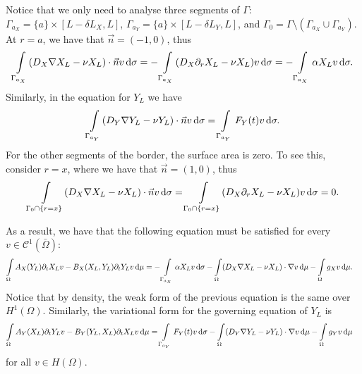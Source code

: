 \documentclass[11pt]{article}
\numberwithin{equation}{section}
\begin{document}
Notice that we only need to analyse three segments of $\Gamma$: $\Gamma_{a_X} = \{a\}\times [L-\delta L_X,L]$, $\Gamma_{a_Y} = \{a\} \times [L - \delta L_Y, L]$, and $ \Gamma_0 = \Gamma \setminus (\Gamma_{a_X} \cup \Gamma_{a_Y})$. At $r = a$, we have that $ \vec{n} = (-1,0)$, thus
\begin{align}
    \int\limits_{\Gamma_{a_X}}
    (D_X \nabla X_L - \nu X_L) \cdot \vec{n} v    \dif \sigma
    =
    -
    \int\limits_{\Gamma_{a_X}}
    (D_X \partial_r X_L - \nu X_L) v    \dif \sigma
    =
    -\int\limits_{\Gamma_{a_X}}
    \alpha X_L v    \dif \sigma.
\end{align}
Similarly, in the equation for \(Y_L\) we have
\begin{align}
    \int\limits_{\Gamma_{a_Y}}
    (D_Y \nabla Y_L - \nu Y_L) \cdot \vec{n} v    \dif \sigma
    =
    \int\limits_{\Gamma_{a_Y}}
    F_Y(t) v    \dif \sigma.
\end{align}
For the other segments of the border, the surface area is zero. To see this, consider $r = x$, where we have that $ \vec{n} = (1,0)$, thus
\begin{align}
    \int\limits_{\Gamma_0 \cap \{r=x\}}
    (D_X \nabla X_L - \nu X_L) \cdot \vec{n} v    \dif \sigma
    =
    \int\limits_{\Gamma_0 \cap \{r=x\}}
    (D_X \partial_r X_L - \nu X_L) v    \dif \sigma
    =
    0.
\end{align}

As a result, we have that the following equation must be satisfied for every $v \in \mathcal{C}^1 (\bar\Omega)$:
\begin{align}
    \int\limits_\Omega
    A_X(Y_L) \partial_t X_L v - B_X(X_L,Y_L) \partial_t Y_L v \dif \mu
    &=
    -\int\limits_{\Gamma_{a_X}}    \alpha X_L v    \dif \sigma
    -\int\limits_\Omega        (D_X \nabla X_L - \nu X_L) \cdot \nabla v  \dif \mu
    -\int\limits_\Omega        g_X v \dif \mu.
\end{align}
Notice that by density, the weak form of the previous equation is the same over $H^1(\Omega)$.
Similarly, the variational form for the governing equation of $Y_L$ is
\begin{align}
    \int\limits_\Omega
    A_Y(X_L) \partial_t Y_L v - B_Y(Y_L,X_L) \partial_t X_L v \dif \mu
    &=
    \int\limits_{\Gamma_{a_Y}}     F_Y(t) v    \dif \sigma
    -\int\limits_\Omega        (D_Y \nabla Y_L - \nu Y_L) \cdot \nabla v  \dif \mu
    -\int\limits_\Omega        g_Y v \dif \mu 
\end{align}
for all \(v \in H(\Omega)\).
\end{document}
